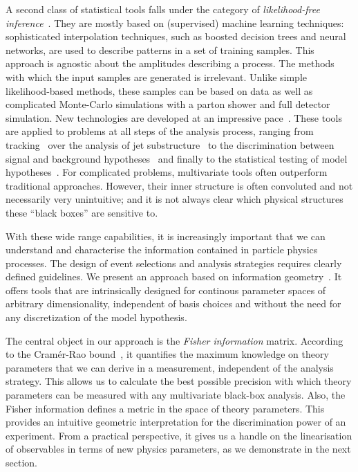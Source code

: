 A second class of statistical tools falls under the category of
\emph{likelihood-free inference}~\cite{cranmer:nips2016}. They are
mostly based on (supervised) machine learning techniques:
sophisticated interpolation techniques, such as boosted decision trees
and neural networks, are used to describe patterns in a set of
training samples. This approach is agnostic about the amplitudes
describing a process. The methods with which the input samples are
generated is irrelevant. Unlike simple likelihood-based methods, these
samples can be based on data as well as complicated Monte-Carlo
simulations with a parton shower and full detector simulation. New
technologies are developed at an impressive
pace~\cite{Cranmer:2015bka, Louppe:2016ylz, Louppe:2016aov,
  Cranmer:2016lzt, Baldi:2016fzo}. These tools are applied to problems
at all steps of the analysis process, ranging from
tracking~\cite{Brehmer:ghost_probability} over the analysis of jet
substructure~\cite{Cogan:2014oua, Baldi:2014pta, deOliveira:2015xxd,
  Almeida:2015jua, Baldi:2016fql, Guest:2016iqz, Komiske:2016rsd,
  Kasieczka:2017nvn, Louppe:2017ipp} to the discrimination between
signal and background hypotheses~\cite{Baldi:2014kfa, Searcy:2015apa,
  Santos:2016kno, Alves:2016htj} and finally to the statistical
testing of model hypotheses~\cite{Buckley:2011kc, Bornhauser:2013aya,
  Bechtle:2017vyu}. For complicated problems, multivariate tools often
outperform traditional approaches. However, their inner structure is
often convoluted and not necessarily very unintuitive; and it is not
always clear which physical structures these ``black boxes'' are
sensitive to.

\newparagraph
%
With these wide range capabilities, it is increasingly important that
we can understand and characterise the information contained in
particle physics processes. The design of event selections and
analysis strategies requires clearly defined guidelines. We present an
approach based on information geometry~\cite{efron1975, amari1982}. It
offers tools that are intrinsically designed for continous parameter
spaces of arbitrary dimensionality, independent of basis choices and
without the need for any discretization of the model hypothesis.

The central object in our approach is the \emph{Fisher information}
matrix. According to the Cram\'er-Rao bound~\cite{Rao:1945,
  Cramer:1946, Rao:1994}, it quantifies the maximum knowledge on
theory parameters that we can derive in a measurement, independent of
the analysis strategy. This allows us to calculate the best possible
precision with which theory parameters can be measured with any
multivariate black-box analysis. Also, the Fisher information defines
a metric in the space of theory parameters. This provides an intuitive
geometric interpretation for the discrimination power of an
experiment. From a practical perspective, it gives us a handle on the
linearisation of observables in terms of new physics parameters, as we
demonstrate in the next section.

